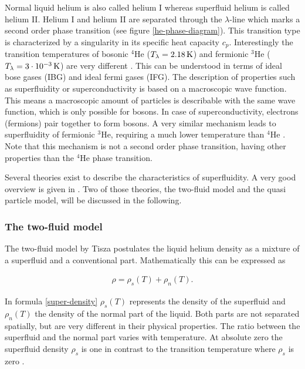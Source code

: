 \documentclass[parskip,12pt,headsepline,a4paper] {scrbook}
\begin{document}
Normal liquid helium is also called helium I whereas superfluid helium is called helium II. Helium I and helium II are separated through the $\lambda$-line which marks a second order phase transition (see figure \ref{he-phase-diagram}). This transition type is characterized by a singularity in its specific heat capacity $c_p$. Interestingly the transition temperatures of bosonic $^4$He ($T_\lambda = \unit[2.18]{K}$) and fermionic $^3$He ($T_\lambda = \unit[3\cdot10^{-3}]{K}$) are very different \cite{toennis}. This can be understood in terms of ideal bose gases (IBG) and ideal fermi gases (IFG). The description of properties such as superfluidity or superconductivity is based on a macroscopic wave function. This means a macroscopic amount of particles is describable with the same wave function, which is only possible for bosons. In case of superconductivity, electrons (fermions) pair together to form bosons. A very similar mechanism leads to superfluidity of fermionic $^3$He, requiring a much lower temperature than $^4$He \cite{fliessbach}. Note that this mechanism is not a second order phase transition, having other properties than the $^4$He phase transition.

Several theories exist to describe the characteristics of superfluidity. A very good overview is given in \cite{fliessbach}. Two of those theories, the two-fluid model and the quasi particle model, will be discussed in the following.

\subsubsection{The two-fluid model}
\vspace{-1\baselineskip}
The two-fluid model by Tisza \cite{tisza} postulates the liquid helium density as a mixture of a superfluid and a conventional part. Mathematically this can be expressed as

\begin{align}  \label{super-density}
\rho = \rho_s(T) + \rho_n(T) .
\end{align}

In formula \ref{super-density} $\rho_s(T)$ represents the density of the superfluid and $\rho_n(T)$ the density of the normal part of the liquid. Both parts are not separated spatially, but are very different in their physical properties. The ratio between the superfluid and the normal part varies with temperature. At absolute zero the superfluid density $\rho_s$ is one in contrast to the transition temperature where $\rho_s$ is zero \cite{fliessbach}.
\end{document}
